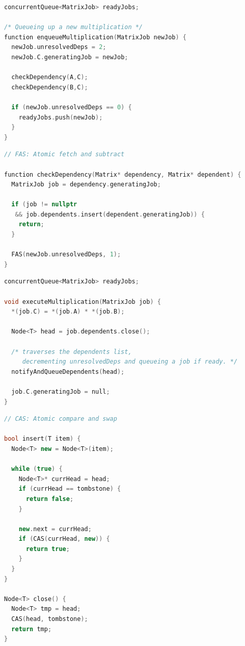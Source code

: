 \begin{algfloat}[htbp]
\begin{lstlisting}[language=C++, caption={Queueing Logic}, label={alg:queue}]
concurrentQueue<MatrixJob> readyJobs;

/* Queueing up a new multiplication */
function enqueueMultiplication(MatrixJob newJob) {
  newJob.unresolvedDeps = 2;
  newJob.C.generatingJob = newJob;

  checkDependency(A,C);
  checkDependency(B,C);

  if (newJob.unresolvedDeps == 0) {
    readyJobs.push(newJob);
  }
}
\end{lstlisting}

\begin{lstlisting}[language=C++, caption={Dependency Processing}, label={alg:deps1}]
// FAS: Atomic fetch and subtract

function checkDependency(Matrix* dependency, Matrix* dependent) {
  MatrixJob job = dependency.generatingJob;

  if (job != nullptr
   && job.dependents.insert(dependent.generatingJob)) {
    return;
  }

  FAS(newJob.unresolvedDeps, 1);
}
\end{lstlisting}
\caption{Matrix queueing and dependency management logic.}
\label{alg:queue-mults}
\end{algfloat}

\begin{algfloat}[htbp]
    \centering
    \begin{lstlisting}[language=C++]
concurrentQueue<MatrixJob> readyJobs;

void executeMultiplication(MatrixJob job) {
  *(job.C) = *(job.A) * *(job.B);

  Node<T> head = job.dependents.close();

  /* traverses the dependents list,
     decrementing unresolvedDeps and queueing a job if ready. */
  notifyAndQueueDependents(head);

  job.C.generatingJob = null;
}
    \end{lstlisting}
    \caption{Asynchronous matrix multiplication and dependency management logic.}
    \label{alg:async-mults}
\end{algfloat}

\begin{algfloat}[htbp]
    \centering
    \begin{lstlisting}[language=C++]
// CAS: Atomic compare and swap

bool insert(T item) {
  Node<T> new = Node<T>(item);

  while (true) {
    Node<T>* currHead = head;
    if (currHead == tombstone) {
      return false;
    }

    new.next = currHead;
    if (CAS(currHead, new)) {
      return true;
    }
  }
}

Node<T> close() {
  Node<T> tmp = head;
  CAS(head, tombstone);
  return tmp;
}
    \end{lstlisting}
    \caption{Lock-free list operations.}
    \label{alg:lock-free-list}
\end{algfloat}

